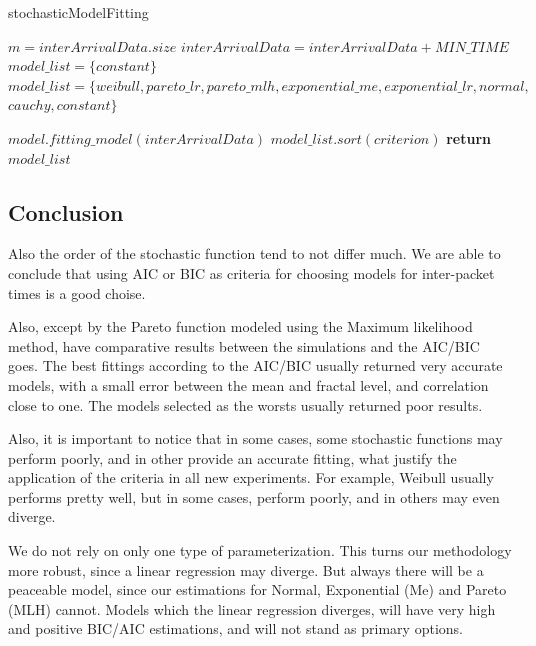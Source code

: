 \begin{algorithm}[ht!]
	\caption{stochasticModelFitting}
	\label{alg:stochasticModelFitting}
	\begin{algorithmic}[1]
		\small		{}
		\State $m = interArrivalData.size$
		\State $interArrivalData = interArrivalData + MIN\_TIME$
		\State $model\_list = \{constant\}$
		\Else
		\State $model\_list = \{weibull, pareto\_lr, pareto\_mlh, exponential\_me, exponential\_lr, normal,$
		\State $cauchy, constant\}$
		\EndIf
		
		\State $model.fitting\_model(interArrivalData)$
		\EndFor
		\State $model\_list.sort(criterion)$
		\State \textbf{return} $model\_list$
		\EndFunction
	\end{algorithmic}
\end{algorithm}


\subsection{Conclusion}



Also the order of the stochastic function tend to not differ much. We are able to conclude that using AIC or BIC as criteria for choosing models for inter-packet times is a good choise.

Also, except by the Pareto function modeled using the Maximum likelihood method, have comparative results between the simulations and the AIC/BIC goes. The best fittings according to the AIC/BIC usually returned very accurate models, with a small error between the mean and fractal level, and correlation close to one. The models selected as the worsts usually returned poor results.

Also, it is important to notice that in some cases, some stochastic functions may perform poorly, and in other provide an accurate fitting, what justify the application of the criteria in all new experiments. For example, Weibull usually performs pretty well, but in some cases, perform poorly, and in others may even diverge. 

We do not rely on only one type of parameterization. This turns our methodology more robust, since a linear regression may diverge. But always there will be a peaceable model, since our estimations for Normal, Exponential (Me) and Pareto (MLH) cannot. Models which the linear regression diverges, will have very high and positive BIC/AIC estimations, and will not stand as primary options.



